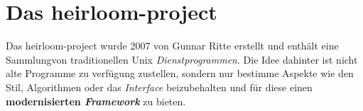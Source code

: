 \section{Das heirloom-project}
Das heirloom-project wurde 2007 von Gunnar Ritte erstellt und enthält eine Sammlungvon traditionellen Unix \textit{Dienstprogrammen}. Die Idee dahinter ist nicht alte Programme zu verfügung zustellen, sondern nur bestimme Aspekte wie den Stil, Algorithmen oder das \textit{Interface} beizubehalten und für diese einen \textbf{modernisierten \textit{Framework}} zu bieten. 
